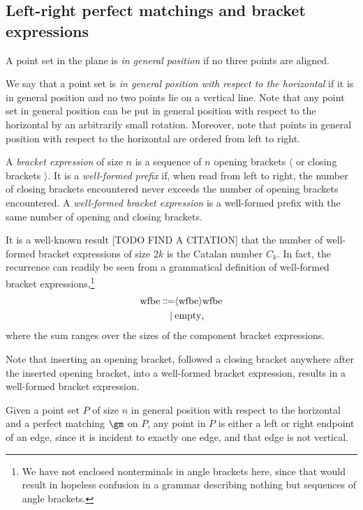 \documentclass[10pt, a4paper, twoside]{basestyle}
\begin{document}
\subsection{Left-right perfect matchings and bracket expressions}
A point set in the plane is \emph{in general position} if no three points are aligned.

We say that a point set is \emph{in general position with respect to the horizontal} if it
is in general position and no two points lie on a vertical line. Note that any point set in
general position can be put in general position with respect to the horizontal by an arbitrarily
small rotation. Moreover, note that points in general position with respect to the horizontal
are ordered from left to right.

A \emph{bracket expression} of size $n$ is a sequence of $n$ opening brackets $\langle$ or closing
brackets $\rangle$.
It is a \emph{well-formed prefix} if, when read from left to right, the number of closing brackets
encountered never exceeds the number of opening brackets encountered.
A \emph{well-formed bracket expression} is a well-formed prefix with the same number of opening and
closing brackets.

It is a well-known result [TODO FIND A CITATION] that the number of well-formed bracket expressions
of size $2k$ is the Catalan number $C_k$. In fact, the recurrence can readily be seen from
a grammatical definition of well-formed bracket expressions,\footnote{We have not enclosed nonterminals
in angle brackets here, since that would result in hopeless confusion in a grammar describing nothing but
sequences of angle brackets.}\begin{align*}
\text{wfbe} \Coloneq
& \langle \text{wfbe} \rangle \text{wfbe} \\
\mid\: & \text{empty}\text,
\end{align*}
where the sum ranges over the sizes of the component bracket expressions.

Note that inserting an opening bracket, followed a closing bracket anywhere after the
inserted opening bracket, into a well-formed bracket expression, results in a well-formed bracket
expression.

Given a point set $P$  of size $n$ in general position with respect to the horizontal and a perfect
matching $\gm$ on $P$, any point in $P$ is either a left or right endpoint of an edge, since it
is incident to exactly one edge, and that edge is not vertical.
\end{document}
